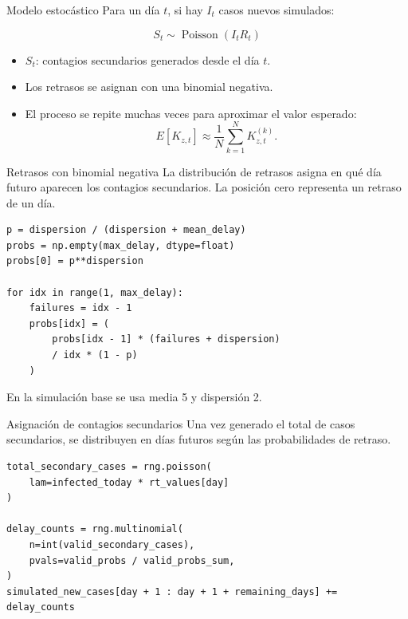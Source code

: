 \documentclass[aspectratio=169]{beamer}
\begin{document}
\begin{frame}{Modelo estocástico}
  Para un día \(t\), si hay \(I_t\) casos nuevos simulados:

  \[
    S_t \sim \operatorname{Poisson}(I_t R_t)
  \]

  \begin{itemize}
    \item \(S_t\): contagios secundarios generados desde el día \(t\).
    \item Los retrasos se asignan con una binomial negativa.
    \item El proceso se repite muchas veces para aproximar el valor esperado:
      \[
        E[K_{z,t}] \approx \frac{1}{N}\sum_{k=1}^{N}K_{z,t}^{(k)}.
      \]
  \end{itemize}
\end{frame}

\begin{frame}[fragile]{Retrasos con binomial negativa}
  \small
  La distribución de retrasos asigna en qué día futuro aparecen los contagios
  secundarios. La posición cero representa un retraso de un día.

  \vspace{0.2cm}

  \scriptsize
  \begin{verbatim}
p = dispersion / (dispersion + mean_delay)
probs = np.empty(max_delay, dtype=float)
probs[0] = p**dispersion

for idx in range(1, max_delay):
    failures = idx - 1
    probs[idx] = (
        probs[idx - 1] * (failures + dispersion)
        / idx * (1 - p)
    )
  \end{verbatim}

  \normalsize
  En la simulación base se usa media 5 y dispersión 2.
\end{frame}

\begin{frame}[fragile]{Asignación de contagios secundarios}
  \small
  Una vez generado el total de casos secundarios, se distribuyen en días
  futuros según las probabilidades de retraso.

  \vspace{0.2cm}

  \scriptsize
  \begin{verbatim}
total_secondary_cases = rng.poisson(
    lam=infected_today * rt_values[day]
)

delay_counts = rng.multinomial(
    n=int(valid_secondary_cases),
    pvals=valid_probs / valid_probs_sum,
)
simulated_new_cases[day + 1 : day + 1 + remaining_days] += delay_counts
  \end{verbatim}
\end{frame}
\end{document}
